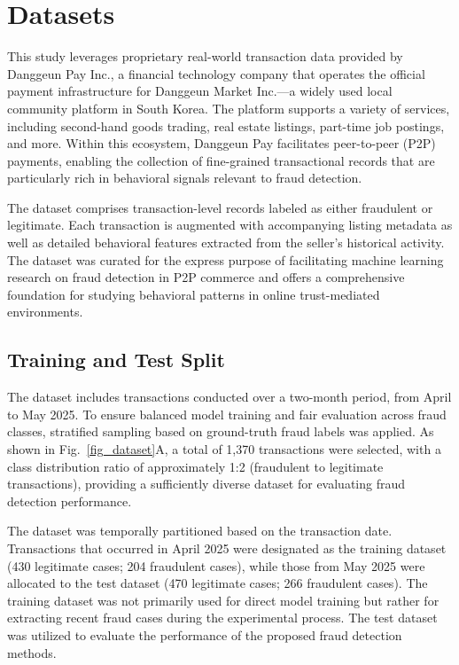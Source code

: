 \documentclass[sigconf]{acmart}
\begin{document}
\section{Datasets}\label{datasets}


This study leverages proprietary real-world transaction data provided by Danggeun Pay Inc., a financial technology company that operates the official payment infrastructure for Danggeun Market Inc.—a widely used local community platform in South Korea. The platform supports a variety of services, including second-hand goods trading, real estate listings, part-time job postings, and more. Within this ecosystem, Danggeun Pay facilitates peer-to-peer (P2P) payments, enabling the collection of fine-grained transactional records that are particularly rich in behavioral signals relevant to fraud detection.



The dataset comprises transaction-level records labeled as either fraudulent or legitimate. Each transaction is augmented with accompanying listing metadata as well as detailed behavioral features extracted from the seller's historical activity. The dataset was curated for the express purpose of facilitating machine learning research on fraud detection in P2P commerce and offers a comprehensive foundation for studying behavioral patterns in online trust-mediated environments.




\subsection{Training and Test Split}
The dataset includes transactions conducted over a two-month period, from April to May 2025. To ensure balanced model training and fair evaluation across fraud classes, stratified sampling based on ground-truth fraud labels was applied. As shown in Fig.~\ref{fig_dataset}A, a total of 1,370 transactions were selected, with a class distribution ratio of approximately 1:2 (fraudulent to legitimate transactions), providing a sufficiently diverse dataset for evaluating fraud detection performance.

The dataset was temporally partitioned based on the transaction date. Transactions that occurred in April 2025 were designated as the training dataset (430 legitimate cases; 204 fraudulent cases), while those from May 2025 were allocated to the test dataset (470 legitimate cases; 266 fraudulent cases). The training dataset was not primarily used for direct model training but rather for extracting recent fraud cases during the experimental process. The test dataset was utilized to evaluate the performance of the proposed fraud detection methods.
\end{document}
